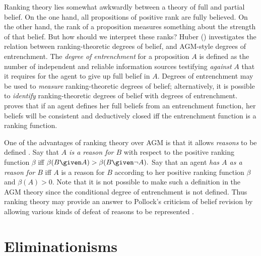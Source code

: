 Ranking theory lies somewhat awkwardly between a theory of full and partial
belief. On the one hand, all propositions of positive rank are fully believed.
On the other hand, the rank of a proposition measures something about the
strength of that belief. But how should we interpret these ranks?
Huber () investigates the relation between ranking-theoretic
degrees of belief, and AGM-style degrees of entrenchment. The {\em degree of
entrenchment} for a proposition $A$ is defined as the number of independent and
reliable information sources testifying {\em against} $A$ that it requires for
the agent to give up full belief in $A$. Degrees of entrenchment may be used to
{\em measure} ranking-theoretic degrees of belief; alternatively, it is possible
to {\em identify} ranking-theoretic degrees of belief with degrees of
entrenchment. \citet{huber2019belief} proves that if an agent defines her full
beliefs from an entrenchment function, her beliefs will be consistent and
deductively closed iff the entrenchment function is a ranking function.

One of the advantages of ranking theory over AGM is that it allows {\em reasons}
to be defined \citep{spohn2012laws}. Say that {\em $A$ is a reason for $B$} with
respect to the positive ranking function $\beta$ iff $\beta(B \given A)>\beta(B
\given \neg A).$ Say that an agent {\em has $A$ as a reason for $B$} iff $A$ is
a reason for $B$ according to her positive ranking function $\beta$ and
$\beta(A)>0$. Note that it is not possible to make such a definition in the AGM
theory since the conditional degree of entrenchment is not defined. Thus ranking
theory may provide an answer to Pollock's criticism of belief revision by
allowing various kinds of defeat of reasons to be represented \citep[Section
11.5]{spohn2012laws}.  


\section{Eliminationisms}

